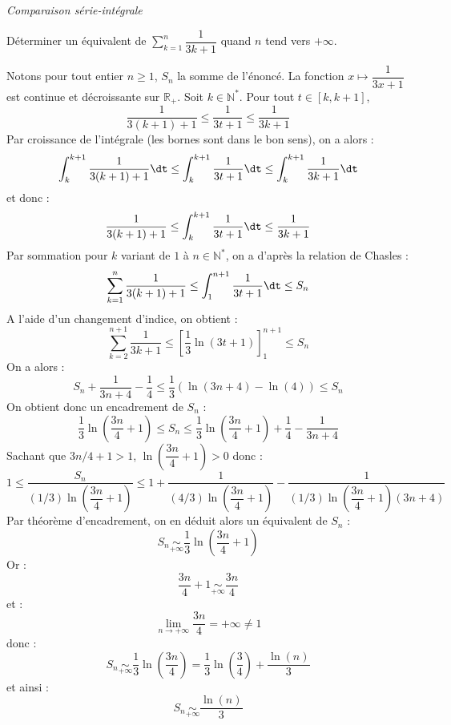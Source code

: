 \documentclass[a4paper,10pt]{report}
\newcommand{\Sum}[2]{\ensuremath{\textstyle{\sum\limits_{#1}^{#2}}}}
\begin{document}
\medskip

\begin{center}
\textit{{ {\large Comparaison série-intégrale}}}
\end{center}

\medskip

\begin{Exa} Déterminer un équivalent de $\Sum{k=1}n \dfrac{1}{3k+1}$ quand $n$ tend vers $+ \infty$.
\end{Exa}

\corr Notons pour tout entier $n \geq 1$, $S_n$ la somme de l'énoncé. La fonction $x \mapsto \dfrac{1}{3x+1}$ est continue et décroissante sur $\mathbb{R}_+$. Soit $k \in \mathbb{N}^*$. Pour tout $t \in [k,k+1]$,
$$ \dfrac{1}{3(k+1)+1} \leq \dfrac{1}{3t+1} \leq \dfrac{1}{3k+1}$$
Par croissance de l'intégrale (les bornes sont dans le bon sens), on a alors :
$$ \int_{k}^{k+1} \dfrac{1}{3(k+1)+1} \dt \leq  \int_{k}^{k+1} \dfrac{1}{3t+1} \dt \leq  \int_{k}^{k+1} \dfrac{1}{3k+1} \dt$$
et donc :
$$  \dfrac{1}{3(k+1)+1}  \leq  \int_{k}^{k+1} \dfrac{1}{3t+1} \dt  \leq  \dfrac{1}{3k+1} $$
Par sommation pour $k$ variant de $1$ à $n \in \mathbb{N}^*$, on a d'après la relation de Chasles :
$$ \sum_{k=1}^n \dfrac{1}{3(k+1)+1}  \leq  \int_{1}^{n+1} \dfrac{1}{3t+1} \dt  \leq S_n $$
A l'aide d'un changement d'indice, on obtient :
$$ \sum_{k=2}^{n+1} \dfrac{1}{3k+1}  \leq  \left[ \dfrac{1}{3} \ln(3t+1) \right]_1^{n+1}  \leq S_n $$
On a alors :
$$ S_n + \dfrac{1}{3n+4} - \dfrac{1}{4} \leq \dfrac{1}{3} ( \ln(3n+4)- \ln(4)) \leq S_n $$
On obtient donc un encadrement de $S_n$ :
$$ \dfrac{1}{3} \ln \left( \dfrac{3n}{4} + 1 \right) \leq S_n \leq \dfrac{1}{3} \ln \left( \dfrac{3n}{4} + 1 \right) + \dfrac{1}{4} - \dfrac{1}{3n+4}$$
Sachant que $3n/4+1>1$, $\ln \left( \dfrac{3n}{4} + 1 \right)>0$ donc :
$$ 1 \leq \dfrac{S_n}{(1/3)\ln \left( \dfrac{3n}{4} + 1 \right)} \leq 1 + \dfrac{1}{(4/3)\ln \left( \dfrac{3n}{4} + 1 \right)} - \dfrac{1}{(1/3)\ln \left( \dfrac{3n}{4} + 1 \right)(3n+4)}$$
Par théorème d'encadrement, on en déduit alors un équivalent de $S_n$ :
$$ S_n \underset{+ \infty}{\sim}\dfrac{1}{3} \ln \left( \dfrac{3n}{4} + 1 \right)$$
Or :
$$  \dfrac{3n}{4} + 1 \underset{+ \infty}{\sim}  \dfrac{3n}{4}$$
et :
$$ \lim_{n \rightarrow + \infty}  \dfrac{3n}{4} = + \infty \neq 1$$
donc :
$$ S_n \underset{+ \infty}{\sim} \dfrac{1}{3} \ln \left( \dfrac{3n}{4} \right) =  \dfrac{1}{3} \ln \left( \dfrac{3}{4} \right) + \dfrac{\ln(n)}{3}$$
et ainsi :
$$ S_n \underset{+ \infty}{\sim}\dfrac{\ln(n)}{3}$$

\medskip
\end{document}
